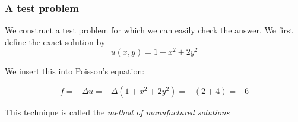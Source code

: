 \begin{frame}
  \frametitle{A test problem}

  We construct a test problem for which we can easily check the
  answer. We first define the exact solution by
  \begin{equation*}
    u(x, y) = 1 + x^2 + 2y^2
  \end{equation*}

  \bigskip

  We insert this into Poisson's equation:

  \begin{equation*}
     f = -\Delta u = -\Delta (1 + x^2 + 2y^2) = -(2 + 4) = -6
  \end{equation*}

  \bigskip

  This technique is called the \emph{method of manufactured solutions}

\end{frame}
